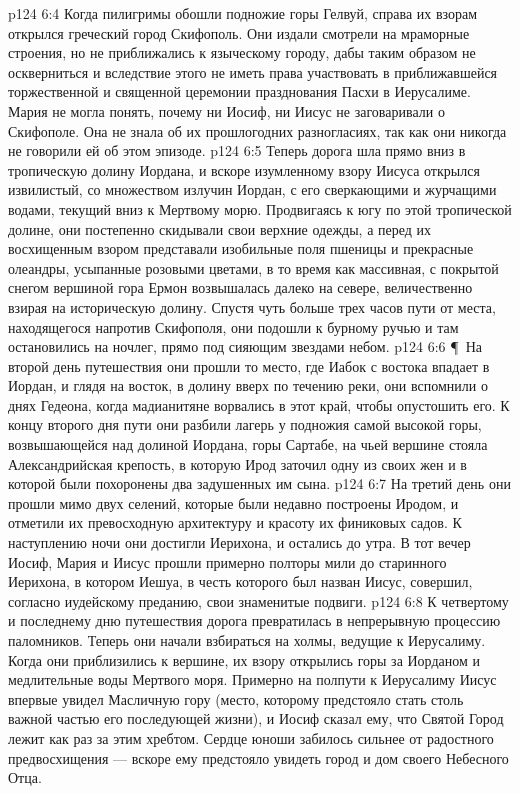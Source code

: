 \vs p124 6:4 Когда пилигримы обошли подножие горы Гелвуй, справа их взорам открылся греческий город Скифополь. Они издали смотрели на мраморные строения, но не приближались к языческому городу, дабы таким образом не оскверниться и вследствие этого не иметь права участвовать в приближавшейся торжественной и священной церемонии празднования Пасхи в Иерусалиме. Мария не могла понять, почему ни Иосиф, ни Иисус не заговаривали о Скифополе. Она не знала об их прошлогодних разногласиях, так как они никогда не говорили ей об этом эпизоде.
\vs p124 6:5 Теперь дорога шла прямо вниз в тропическую долину Иордана, и вскоре изумленному взору Иисуса открылся извилистый, со множеством излучин Иордан, с его сверкающими и журчащими водами, текущий вниз к Мертвому морю. Продвигаясь к югу по этой тропической долине, они постепенно скидывали свои верхние одежды, а перед их восхищенным взором представали изобильные поля пшеницы и прекрасные олеандры, усыпанные розовыми цветами, в то время как массивная, с покрытой снегом вершиной гора Ермон возвышалась далеко на севере, величественно взирая на историческую долину. Спустя чуть больше трех часов пути от места, находящегося напротив Скифополя, они подошли к бурному ручью и там остановились на ночлег, прямо под сияющим звездами небом.
\vs p124 6:6 \P\ На второй день путешествия они прошли то место, где Иабок с востока впадает в Иордан, и глядя на восток, в долину вверх по течению реки, они вспомнили о днях Гедеона, когда мадианитяне ворвались в этот край, чтобы опустошить его. К концу второго дня пути они разбили лагерь у подножия самой высокой горы, возвышающейся над долиной Иордана, горы Сартабе, на чьей вершине стояла Александрийская крепость, в которую Ирод заточил одну из своих жен и в которой были похоронены два задушенных им сына.
\vs p124 6:7 На третий день они прошли мимо двух селений, которые были недавно построены Иродом, и отметили их превосходную архитектуру и красоту их финиковых садов. К наступлению ночи они достигли Иерихона, и остались до утра. В тот вечер Иосиф, Мария и Иисус прошли примерно полторы мили до старинного Иерихона, в котором Иешуа, в честь которого был назван Иисус, совершил, согласно иудейскому преданию, свои знаменитые подвиги.
\vs p124 6:8 К четвертому и последнему дню путешествия дорога превратилась в непрерывную процессию паломников. Теперь они начали взбираться на холмы, ведущие к Иерусалиму. Когда они приблизились к вершине, их взору открылись горы за Иорданом и медлительные воды Мертвого моря. Примерно на полпути к Иерусалиму Иисус впервые увидел Масличную гору (место, которому предстояло стать столь важной частью его последующей жизни), и Иосиф сказал ему, что Святой Город лежит как раз за этим хребтом. Сердце юноши забилось сильнее от радостного предвосхищения --- вскоре ему предстояло увидеть город и дом своего Небесного Отца.
